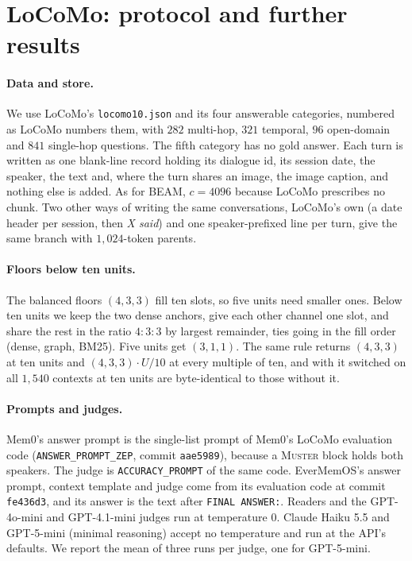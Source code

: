 \documentclass{article}
\newcommand{\sys}{\textsc{Muster}}
\begin{document}
\section{LoCoMo: protocol and further results}\label{app:locomo}

\paragraph{Data and store.} We use LoCoMo's \texttt{locomo10.json} and its four answerable categories, numbered as LoCoMo numbers them, with $282$ multi-hop, $321$ temporal, $96$ open-domain and $841$ single-hop questions. The fifth category has no gold answer. Each turn is written as one blank-line record holding its dialogue id, its session date, the speaker, the text and, where the turn shares an image, the image caption, and nothing else is added. As for BEAM, $c=4096$ because LoCoMo prescribes no chunk. Two other ways of writing the same conversations, LoCoMo's own (a date header per session, then \emph{X said}) and one speaker-prefixed line per turn, give the same branch with $1{,}024$-token parents.

\paragraph{Floors below ten units.} The balanced floors $(4,3,3)$ fill ten slots, so five units need smaller ones. Below ten units we keep the two dense anchors, give each other channel one slot, and share the rest in the ratio $4{:}3{:}3$ by largest remainder, ties going in the fill order (dense, graph, BM25). Five units get $(3,1,1)$. The same rule returns $(4,3,3)$ at ten units and $(4,3,3)\cdot U/10$ at every multiple of ten, and with it switched on all $1{,}540$ contexts at ten units are byte-identical to those without it.

\paragraph{Prompts and judges.} Mem0's answer prompt is the single-list prompt of Mem0's LoCoMo evaluation code (\texttt{ANSWER\_PROMPT\_ZEP}, commit \texttt{aae5989}), because a \sys{} block holds both speakers. The judge is \texttt{ACCURACY\_PROMPT} of the same code. EverMemOS's answer prompt, context template and judge come from its evaluation code at commit \texttt{fe436d3}, and its answer is the text after \texttt{FINAL ANSWER:}. Readers and the GPT-4o-mini and GPT-4.1-mini judges run at temperature $0$. Claude Haiku 5.5 and GPT-5-mini (minimal reasoning) accept no temperature and run at the API's defaults. We report the mean of three runs per judge, one for GPT-5-mini.
\end{document}
